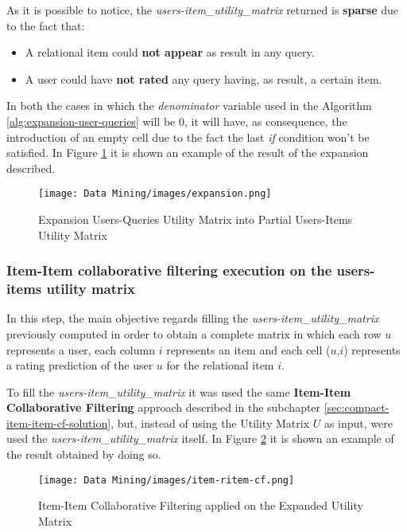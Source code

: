 As it is possible to notice, the \textit{users-item\_utility\_matrix} returned is \textbf{sparse} due to the fact that:
\begin{itemize}
    \item A relational item could \textbf{not appear} as result in any query.
    \item A user could have \textbf{not rated} any query having, as result, a certain item.
\end{itemize}
In both the cases in which the \textit{denominator} variable used in the Algorithm \ref{alg:expansion-user-queries} will be 0, it will have, as consequence, the introduction of an empty cell due to the fact the last \textit{if} condition won't be satisfied. In Figure \ref{fig:expansion} it is shown an example of the result of the expansion described.

\begin{figure}[h!]
\centering
\texttt{[image: Data Mining/images/expansion.png]}
\caption{Expansion Users-Queries Utility Matrix into Partial Users-Items Utility Matrix}
\label{fig:expansion}
\end{figure}

\subsubsection{Item-Item collaborative filtering execution on the users-
items utility matrix}
\label{sec:expanded-cf}
In this step, the main objective regards filling the \textit{users-item\_utility\_matrix} previously computed in order to obtain a complete matrix in which each row $u$ represents a user, each column $i$ represents an item and each cell ($u$,$i$) represents a rating prediction of the user $u$ for the relational item $i$.

To fill the \textit{users-item\_utility\_matrix} it was used the same \textbf{Item-Item Collaborative Filtering} approach described in the subchapter \ref{sec:compact-item-item-cf-solution}, but, instead of using the Utility Matrix $U$ as input, were used the \textit{users-item\_utility\_matrix} itself. In Figure \ref{fig:item-ritem-cf} it is shown an example of the result obtained by doing so.

\begin{figure}[h!]
\centering
\texttt{[image: Data Mining/images/item-ritem-cf.png]}
\caption{Item-Item Collaborative Filtering applied on the Expanded Utility Matrix}
\label{fig:item-ritem-cf}
\end{figure}

